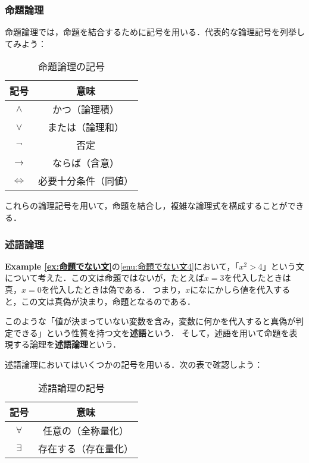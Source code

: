 \documentclass[a4paper,11pt]{ltjsarticle}
\renewcommand{\emph}[1]{\textbf{#1}}
\newcommand{\exref}[1]{{\bfseries\sffamily Example \ref{ex:#1}}}
\begin{document}
\subsubsection{命題論理}

	命題論理では，命題を結合するために記号を用いる．代表的な論理記号を列挙してみよう：

	\begin{table}[ht]
		\centering
		\caption{命題論理の記号}
		\begin{tabular}{c|c}
		\hline
		記号 & 意味 \\
		\hline
    $\land$ & かつ（論理積\index{ろんりせき@論理積}） \\
    $\lor$ & または（論理和\index{ろんりわ@論理和}） \\
    $\lnot$ & 否定\index{ひてい@否定} \\
    $\to$ & ならば（含意\index{がんい@含意}） \\
    $\Leftrightarrow$ & 必要十分条件（同値）\index{どうち@同値} \\
		\hline
		\end{tabular}
		\end{table}

    これらの論理記号を用いて，命題を結合し，複雑な論理式を構成することができる．

    \subsubsection{述語論理}

    \exref{命題でない文}の\ref{enu:命題でない文4}において，「$x^2 >4$」という文について考えた．この文は命題ではないが，たとえば$x=3$を代入したときは真，$x=0$を代入したときは偽である．
    つまり，$x$になにかしら値を代入すると，この文は真偽が決まり，命題となるのである．
    
    このような「値が決まっていない変数を含み，変数に何かを代入すると真偽が判定できる」という性質を持つ文を\emph{述語}という．
    そして，述語を用いて命題を表現する論理を\emph{述語論理}という．


    述語論理においてはいくつかの記号を用いる．次の表で確認しよう：

    \begin{table}[ht] 
      \centering 
      \caption{述語論理の記号} 
      \begin{tabular}{c|c} 
        \hline 
        記号 & 意味 \\
         \hline 
         $\forall$ & 任意の（全称量化\index{ぜんしょうりょうか@全称量化}）\\
        $\exists$ & 存在する（存在量化\index{そんざいりょうか@存在量化}） \\
        \hline 
      \end{tabular} 
      \end{table}
    
\end{document}

